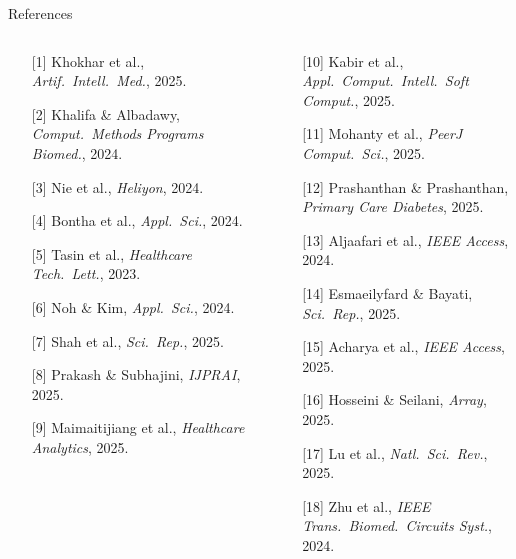 \documentclass[aspectratio=169, 11pt]{beamer}
\begin{document}
\begin{frame}{References}
  \vspace{-0.1cm}
  \scriptsize
  \begin{columns}[T]
    \begin{column}{0.48\textwidth}
      \begin{enumerate}
        \setlength{\itemsep}{0.8pt}
        \item[{[1]}] Khokhar et al., \textit{Artif.\ Intell.\ Med.}, 2025.
        \item[{[2]}] Khalifa \& Albadawy, \textit{Comput.\ Methods Programs Biomed.}, 2024.
        \item[{[3]}] Nie et al., \textit{Heliyon}, 2024.
        \item[{[4]}] Bontha et al., \textit{Appl.\ Sci.}, 2024.
        \item[{[5]}] Tasin et al., \textit{Healthcare Tech.\ Lett.}, 2023.
        \item[{[6]}] Noh \& Kim, \textit{Appl.\ Sci.}, 2024.
        \item[{[7]}] Shah et al., \textit{Sci.\ Rep.}, 2025.
        \item[{[8]}] Prakash \& Subhajini, \textit{IJPRAI}, 2025.
        \item[{[9]}] Maimaitijiang et al., \textit{Healthcare Analytics}, 2025.
      \end{enumerate}
    \end{column}
    \begin{column}{0.48\textwidth}
      \begin{enumerate}
        \setlength{\itemsep}{0.8pt}
        \item[{[10]}] Kabir et al., \textit{Appl.\ Comput.\ Intell.\ Soft Comput.}, 2025.
        \item[{[11]}] Mohanty et al., \textit{PeerJ Comput.\ Sci.}, 2025.
        \item[{[12]}] Prashanthan \& Prashanthan, \textit{Primary Care Diabetes}, 2025.
        \item[{[13]}] Aljaafari et al., \textit{IEEE Access}, 2024.
        \item[{[14]}] Esmaeilyfard \& Bayati, \textit{Sci.\ Rep.}, 2025.
        \item[{[15]}] Acharya et al., \textit{IEEE Access}, 2025.
        \item[{[16]}] Hosseini \& Seilani, \textit{Array}, 2025.
        \item[{[17]}] Lu et al., \textit{Natl.\ Sci.\ Rev.}, 2025.
        \item[{[18]}] Zhu et al., \textit{IEEE Trans.\ Biomed.\ Circuits Syst.}, 2024.
      \end{enumerate}
    \end{column}
  \end{columns}
\end{frame}
\end{document}
